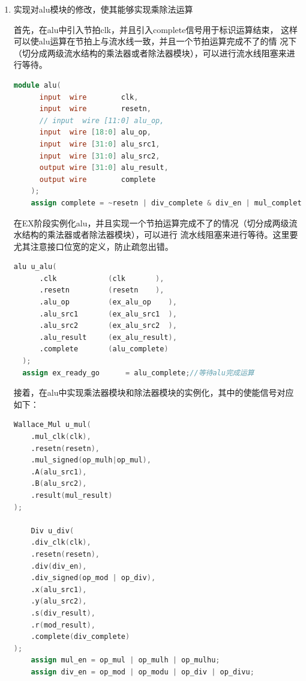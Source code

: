 \documentclass[11pt]{article}
\begin{document}
\begin{enumerate}
  \item 实现对alu模块的修改，使其能够实现乘除法运算
  
  首先，在alu中引入节拍clk，并且引入complete信号用于标识运算结束，
  这样可以使alu运算在节拍上与流水线一致，并且一个节拍运算完成不了的情
  况下（切分成两级流水结构的乘法器或者除法器模块），可以进行流水线阻塞来进行等待。
  \begin{lstlisting}[language=verilog]
    module alu(
      input  wire        clk,
      input  wire        resetn,
      // input  wire [11:0] alu_op,
      input  wire [18:0] alu_op,
      input  wire [31:0] alu_src1,
      input  wire [31:0] alu_src2,
      output wire [31:0] alu_result,
      output wire        complete
    );
    assign complete = ~resetn | div_complete & div_en | mul_complete & mul_en | ~div_en & ~mul_en;
  \end{lstlisting}

  在EX阶段实例化alu，并且实现一个节拍运算完成不了的情况（切分成两级流水结构的乘法器或者除法器模块），可以进行
  流水线阻塞来进行等待。这里要尤其注意接口位宽的定义，防止疏忽出错。
  \begin{lstlisting}[language=verilog]
    alu u_alu(
      .clk            (clk       ),
      .resetn         (resetn    ),
      .alu_op         (ex_alu_op    ),
      .alu_src1       (ex_alu_src1  ),
      .alu_src2       (ex_alu_src2  ),
      .alu_result     (ex_alu_result),
      .complete       (alu_complete)
  );
  assign ex_ready_go      = alu_complete;//等待alu完成运算
  \end{lstlisting}

  接着，在alu中实现乘法器模块和除法器模块的实例化，其中的使能信号对应如下：
  \begin{lstlisting}[language=verilog]
    Wallace_Mul u_mul(
    .mul_clk(clk),
    .resetn(resetn),
    .mul_signed(op_mulh|op_mul),
    .A(alu_src1),
    .B(alu_src2),
    .result(mul_result)
);

    Div u_div(
    .div_clk(clk),
    .resetn(resetn),
    .div(div_en),
    .div_signed(op_mod | op_div),
    .x(alu_src1),
    .y(alu_src2),
    .s(div_result),
    .r(mod_result),
    .complete(div_complete)
);
    assign mul_en = op_mul | op_mulh | op_mulhu;
    assign div_en = op_mod | op_modu | op_div | op_divu;
  \end{lstlisting}


\end{enumerate}
\end{document}
